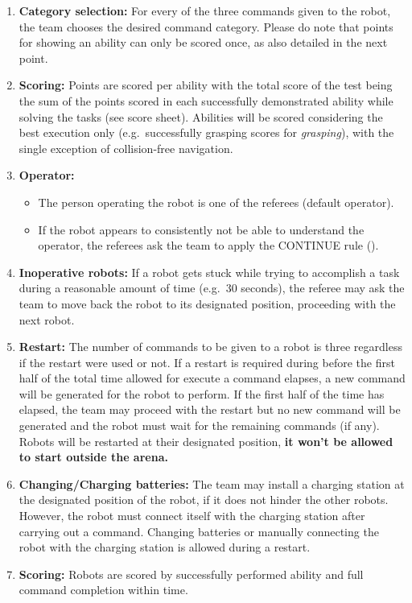 \begin{enumerate}
	\item \textbf{Category selection:} For every of the three commands given to the robot, the team chooses the desired command category. Please do note that points for showing an ability can only be scored once, as also detailed in the next point.\\

	\item \textbf{Scoring:} Points are scored per ability with the total score of the test being the sum of the points scored in each successfully demonstrated ability while solving the tasks (see score sheet). Abilities will be scored considering the best execution only (e.g.~successfully grasping scores for \textit{grasping}), with the single exception of collision-free navigation. \\

	\item \textbf{Operator:}
	\begin{itemize}
		\item The person operating the robot is one of the referees (default operator).
		\item If the robot appears to consistently not be able to understand the operator, the referees ask the team to apply the CONTINUE rule ().
	\end{itemize}

	\item \textbf{Inoperative robots:} If a robot gets stuck while trying to accomplish a task during a reasonable amount of time (e.g.~30 seconds), the referee may ask the team to move back the robot to its designated position, proceeding with the next robot. \\

	\item \textbf{Restart:} The number of commands to be given to a robot is three regardless if the restart were used or not. If a restart is required during before the first half of the total time allowed for execute a command elapses, a new command will be generated for the robot to perform. If the first half of the time has elapsed, the team may proceed with the restart but no new command will be generated and the robot must wait for the remaining commands (if any). Robots will be restarted at their designated position, \textbf{it won't be allowed to start outside the arena.} \\

	\item \textbf{Changing/Charging batteries:} The team may install a charging station at the designated position of the robot, if it does not hinder the other robots. However, the robot must connect itself with the charging station after carrying out a command. Changing batteries or manually connecting the robot with the charging station is allowed during a restart. \\

	\item \textbf{Scoring:} Robots are scored by successfully performed ability and full command completion within time. 
\end{enumerate}

